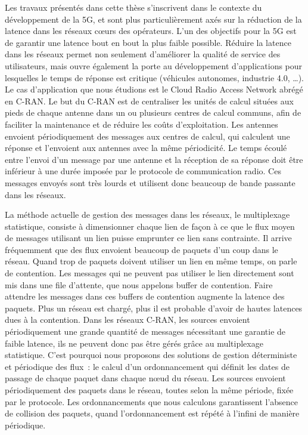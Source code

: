 
\label{chap:introfr}


Les travaux présentés dans cette thèse s'inscrivent dans le contexte du développement de la 5G, et sont plus particulièrement axés sur la réduction de la latence dans les réseaux cœurs des opérateurs.
L'un des objectifs pour la 5G est de garantir une latence bout en bout la plus faible possible.
Réduire la latence dans les réseaux permet non seulement d'améliorer la qualité de service des utilisateurs, mais ouvre également la porte au développement d'applications pour lesquelles le temps de réponse est critique (véhicules autonomes, industrie 4.0, \ldots).
Le cas d'application que nous étudions est le Cloud Radio Access Network abrégé en C-RAN. Le but du C-RAN est de centraliser les unités de calcul situées aux pieds de chaque antenne dans un ou plusieurs centres de calcul communs, afin de faciliter la maintenance et de réduire les coûts d'exploitation. Les antennes envoient périodiquement des messages aux centres de calcul, qui calculent une réponse et l'envoient aux antennes avec la même périodicité. Le temps écoulé entre l'envoi d'un message par une antenne et la réception de sa réponse doit être inférieur à une durée imposée par le protocole de communication radio. Ces messages envoyés sont très lourds et utilisent donc beaucoup de bande passante dans les réseaux.

La méthode actuelle de gestion des messages dans les réseaux, le multiplexage statistique, consiste à dimensionner chaque lien de façon à ce que le flux moyen de messages utilisant un lien puisse emprunter ce lien sans contrainte. Il arrive fréquemment que des flux envoient beaucoup de paquets d'un coup dans le réseau. Quand trop de paquets doivent utiliser un lien en même temps, on parle de contention. Les messages qui ne peuvent pas utiliser le lien directement sont mis dans une file d'attente, que nous appelons buffer de contention. Faire attendre les messages dans ces buffers de contention augmente la latence des paquets. Plus un réseau est chargé, plus il est probable d'avoir de hautes latences dues à la contention. Dans les réseaux C-RAN, les sources envoient périodiquement une grande quantité de messages nécessitant une garantie de faible latence, ils ne peuvent donc pas être gérés grâce au multiplexage statistique. C'est pourquoi nous proposons des solutions de gestion déterministe et périodique des flux : le calcul d'un ordonnancement qui définit les dates de passage de chaque paquet dans chaque nœud du réseau. Les sources envoient périodiquement des paquets dans le réseau, toutes selon la même période, fixée par le protocole. Les ordonnancements que nous calculons garantissent l'absence de collision des paquets, quand l'ordonnancement est répété à l'infini de manière périodique.

